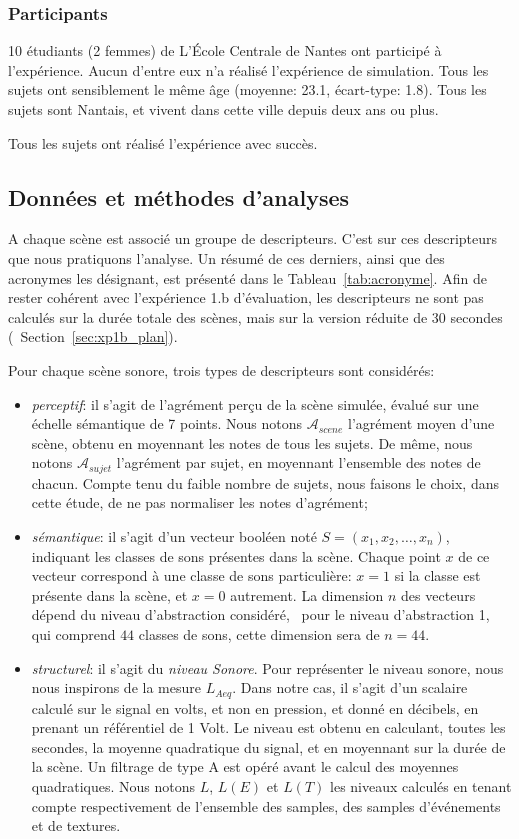 \documentclass[twoside,twocolumn]{article}
\begin{document}
\subsubsection*{Participants}

10 étudiants (2 femmes) de L’École Centrale de Nantes ont participé à l'expérience. Aucun d'entre eux n'a réalisé l'expérience de simulation. Tous les sujets ont sensiblement le même âge (moyenne: 23.1, écart-type: 1.8). Tous les sujets sont Nantais, et vivent dans cette ville depuis deux ans ou plus.

Tous les sujets ont réalisé l'expérience avec succès.

\subsection{Données et méthodes d'analyses}
\label{sec:xp1_dataAna}

A chaque scène est associé un groupe de descripteurs. C'est sur ces descripteurs que nous pratiquons l'analyse. Un résumé de ces derniers, ainsi que des acronymes les désignant, est présenté dans le Tableau~\ref{tab:acronyme}. Afin de rester cohérent avec l’expérience 1.b d'évaluation, les descripteurs ne sont pas calculés sur la durée totale des scènes, mais sur la version réduite de 30 secondes (\cf~Section~\ref{sec:xp1b_plan}).

Pour chaque scène sonore, trois types de descripteurs sont considérés:

\begin{itemize}
\item \emph{perceptif}: il s'agit de l'agrément perçu de la scène simulée, évalué sur une échelle sémantique de 7 points. Nous notons $\mathcal{A}_{scene}$ l'agrément moyen d'une scène, obtenu en moyennant les notes de tous les sujets. De même, nous notons $\mathcal{A}_{sujet}$ l'agrément par sujet, en moyennant l'ensemble des notes de chacun. Compte tenu du faible nombre de sujets, nous faisons le choix, dans cette étude, de ne pas normaliser les notes d'agrément;
\item \emph{sémantique}: il s'agit d'un vecteur booléen noté $S=(x_1,x_2,\ldots,x_n)$, indiquant les classes de sons présentes dans la scène. Chaque point $x$ de ce vecteur correspond à une classe de sons particulière: $x=1$ si la classe est présente dans la scène, et $x=0$ autrement. La dimension $n$ des vecteurs dépend du niveau d'abstraction considéré, \eg~pour le niveau d'abstraction 1, qui comprend $44$ classes de sons, cette dimension sera de $n=44$.
\item \emph{structurel}: il s'agit du \emph{niveau Sonore}. Pour représenter le niveau sonore, nous nous inspirons de la mesure $L_{Aeq}$. Dans notre cas, il s'agit d'un scalaire calculé sur le signal en volts, et non en pression, et donné en décibels, en prenant un référentiel de 1 Volt. Le niveau est obtenu en calculant, toutes les secondes, la moyenne quadratique du signal, et en moyennant sur la durée de la scène. Un filtrage de type A est opéré avant le calcul des moyennes quadratiques. Nous notons $L$, $L(E)$ et $L(T)$ les niveaux calculés en tenant compte respectivement de l'ensemble des samples, des samples d'événements et de textures.
\end{itemize}
\end{document}
